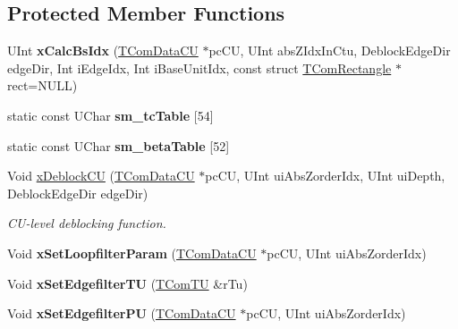 \subsection*{Protected Member Functions}
\begin{DoxyCompactItemize}
\item 
\mbox{\label{class_t_com_loop_filter_a833a2fce04e41fc628747ce8e328d836}} 
U\+Int {\bfseries x\+Calc\+Bs\+Idx} (\hyperlink{class_t_com_data_c_u}{T\+Com\+Data\+CU} $\ast$pc\+CU, U\+Int abs\+Z\+Idx\+In\+Ctu, Deblock\+Edge\+Dir edge\+Dir, Int i\+Edge\+Idx, Int i\+Base\+Unit\+Idx, const struct \hyperlink{struct_t_com_rectangle}{T\+Com\+Rectangle} $\ast$rect=N\+U\+LL)
\end{DoxyCompactItemize}
\begin{DoxyCompactItemize}
\item 
static const U\+Char {\bfseries sm\+\_\+tc\+Table} \mbox{[}54\mbox{]}
\item 
static const U\+Char {\bfseries sm\+\_\+beta\+Table} \mbox{[}52\mbox{]}
\item 
Void \hyperlink{class_t_com_loop_filter_a15915a5d41a74e4194af29f770b99a3d}{x\+Deblock\+CU} (\hyperlink{class_t_com_data_c_u}{T\+Com\+Data\+CU} $\ast$pc\+CU, U\+Int ui\+Abs\+Zorder\+Idx, U\+Int ui\+Depth, Deblock\+Edge\+Dir edge\+Dir)
\begin{DoxyCompactList}\small\item\em C\+U-\/level deblocking function. \end{DoxyCompactList}\item 
\mbox{\label{class_t_com_loop_filter_a341c6c7c7528beac22527a5b903709c4}} 
Void {\bfseries x\+Set\+Loopfilter\+Param} (\hyperlink{class_t_com_data_c_u}{T\+Com\+Data\+CU} $\ast$pc\+CU, U\+Int ui\+Abs\+Zorder\+Idx)
\item 
\mbox{\label{class_t_com_loop_filter_a9bce279c15d6d0f3214081cc796610ba}} 
Void {\bfseries x\+Set\+Edgefilter\+TU} (\hyperlink{class_t_com_t_u}{T\+Com\+TU} \&r\+Tu)
\item 
\mbox{\label{class_t_com_loop_filter_a9b6460744594120affd1b2a643c9091f}} 
Void {\bfseries x\+Set\+Edgefilter\+PU} (\hyperlink{class_t_com_data_c_u}{T\+Com\+Data\+CU} $\ast$pc\+CU, U\+Int ui\+Abs\+Zorder\+Idx)
\item 
\mbox{\label{class_t_com_loop_filter_a26eeeb3f9cb40e9cc239afab2c066864}} 

\end{DoxyCompactItemize}
